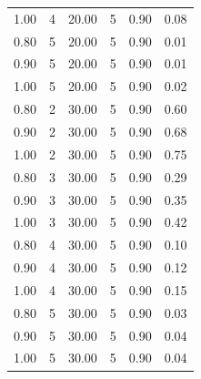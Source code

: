 \documentclass[12pt]{article}
\begin{document}
{\begin{longtable}{cccccc}
  1.00 &   4 & 20.00 &   5 & 0.90 & 0.08 \\ 
  0.80 &   5 & 20.00 &   5 & 0.90 & 0.01 \\ 
  0.90 &   5 & 20.00 &   5 & 0.90 & 0.01 \\ 
  1.00 &   5 & 20.00 &   5 & 0.90 & 0.02 \\ 
  0.80 &   2 & 30.00 &   5 & 0.90 & 0.60 \\ 
  0.90 &   2 & 30.00 &   5 & 0.90 & 0.68 \\ 
  1.00 &   2 & 30.00 &   5 & 0.90 & 0.75 \\ 
  0.80 &   3 & 30.00 &   5 & 0.90 & 0.29 \\ 
  0.90 &   3 & 30.00 &   5 & 0.90 & 0.35 \\ 
  1.00 &   3 & 30.00 &   5 & 0.90 & 0.42 \\ 
  0.80 &   4 & 30.00 &   5 & 0.90 & 0.10 \\ 
  0.90 &   4 & 30.00 &   5 & 0.90 & 0.12 \\ 
  1.00 &   4 & 30.00 &   5 & 0.90 & 0.15 \\ 
  0.80 &   5 & 30.00 &   5 & 0.90 & 0.03 \\ 
  0.90 &   5 & 30.00 &   5 & 0.90 & 0.04 \\ 
  1.00 &   5 & 30.00 &   5 & 0.90 & 0.04 \\ 
   \hline
\end{longtable}



\theendnotes







}
\end{document}
